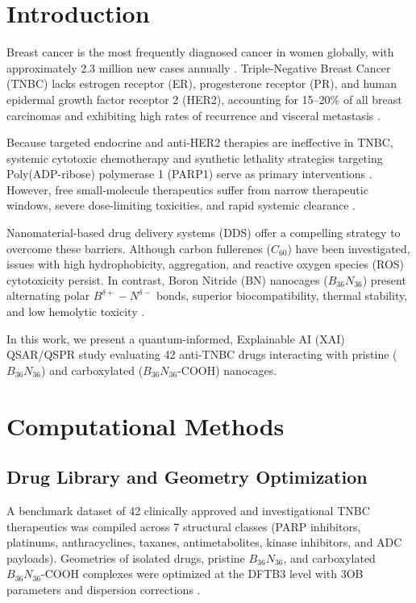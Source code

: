 \documentclass[10pt,a4paper]{article}
\begin{document}
\section{Introduction}
Breast cancer is the most frequently diagnosed cancer in women globally, with approximately 2.3 million new cases annually \cite{Giaquinto2022}. Triple-Negative Breast Cancer (TNBC) lacks estrogen receptor (ER), progesterone receptor (PR), and human epidermal growth factor receptor 2 (HER2), accounting for 15--20\% of all breast carcinomas and exhibiting high rates of recurrence and visceral metastasis \cite{Foulkes2010}.

Because targeted endocrine and anti-HER2 therapies are ineffective in TNBC, systemic cytotoxic chemotherapy and synthetic lethality strategies targeting Poly(ADP-ribose) polymerase 1 (PARP1) serve as primary interventions \cite{Lord2016}. However, free small-molecule therapeutics suffer from narrow therapeutic windows, severe dose-limiting toxicities, and rapid systemic clearance \cite{RoblesHernandez2024}. 

Nanomaterial-based drug delivery systems (DDS) offer a compelling strategy to overcome these barriers. Although carbon fullerenes ($C_{60}$) have been investigated, issues with high hydrophobicity, aggregation, and reactive oxygen species (ROS) cytotoxicity persist. In contrast, Boron Nitride (BN) nanocages ($B_{36}N_{36}$) present alternating polar $B^{\delta+}-N^{\delta-}$ bonds, superior biocompatibility, thermal stability, and low hemolytic toxicity \cite{Ferreira2015, Ciofani2012}.

In this work, we present a quantum-informed, Explainable AI (XAI) QSAR/QSPR study evaluating 42 anti-TNBC drugs interacting with pristine ($B_{36}N_{36}$) and carboxylated ($B_{36}N_{36}\text{-COOH}$) nanocages.

\section{Computational Methods}
\subsection{Drug Library and Geometry Optimization}
A benchmark dataset of 42 clinically approved and investigational TNBC therapeutics was compiled across 7 structural classes (PARP inhibitors, platinums, anthracyclines, taxanes, antimetabolites, kinase inhibitors, and ADC payloads). Geometries of isolated drugs, pristine $B_{36}N_{36}$, and carboxylated $B_{36}N_{36}\text{-COOH}$ complexes were optimized at the DFTB3 level with 3OB parameters and dispersion corrections \cite{Hourahine2020}.
\end{document}
